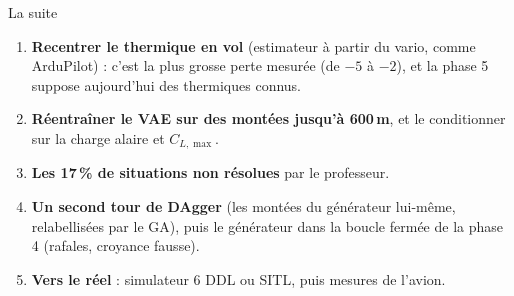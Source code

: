 \documentclass[aspectratio=169,10pt]{beamer}
\begin{document}
\begin{frame}{La suite}
  \begin{enumerate}
    \item \textbf{Recentrer le thermique en vol} (estimateur à partir du vario, comme ArduPilot) : c'est la plus grosse perte mesurée (de $-5$ à $-2$), et la phase 5 suppose aujourd'hui des thermiques connus.
    \item \textbf{Réentraîner le VAE sur des montées jusqu'à 600\,m}, et le conditionner sur la charge alaire et $C_{L,\max}$.
    \item \textbf{Les 17\,\% de situations non résolues} par le professeur.
    \item \textbf{Un second tour de DAgger} (les montées du générateur lui-même, relabellisées par le GA), puis le générateur dans la boucle fermée de la phase 4 (rafales, croyance fausse).
    \item \textbf{Vers le réel} : simulateur 6 DDL ou SITL, puis mesures de l'avion.
  \end{enumerate}
\end{frame}
\end{document}
